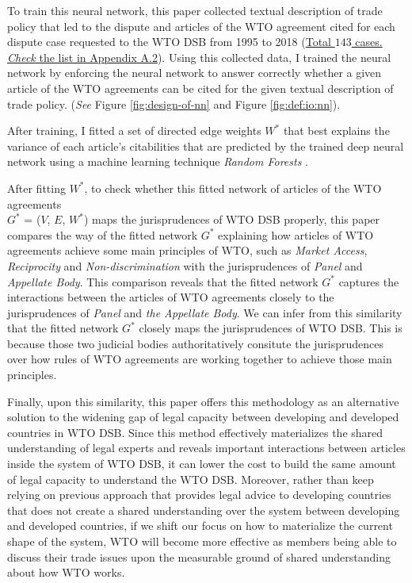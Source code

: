 
To train this neural network, this paper collected textual description of trade policy 
that led to the dispute and articles of the WTO agreement cited for each dispute
case requested to the WTO DSB 
from 1995 to 2018 (\hyperref[sub:cited-articles-table]{Total $143$ cases. \textit{Check} the list in Appendix A.2}).
Using this collected data, I trained the neural network by enforcing the neural network to answer correctly 
whether a given article of the WTO agreements
can be cited for the given textual description of 
trade policy. (\textit{See} Figure \ref{fig:design-of-nn} and Figure \ref{fig:def:io:nn}).

After training, I fitted a set of directed edge weights $W^*$ that 
best explains the variance of each article's citabilities that are predicted by the trained deep neural network using a machine learning technique \textit{Random Forests} \citep{rf, genie3}. 

After fitting $W^*$, to check whether this fitted network of articles of the WTO agreements\\  $G^*$ = ($V$, $E$, $W^*$) maps the jurisprudences of WTO DSB properly, this paper
compares the way of the fitted network $G^*$ explaining how articles of WTO agreements achieve some main principles of WTO, such as \textit{Market Access}, \textit{Reciprocity} and \textit{Non-discrimination} 
with the jurisprudences of \textit{Panel} and \textit{Appellate Body}. This comparison reveals that the fitted network $G^*$ captures the interactions between the articles of WTO agreements
closely to the jurisprudences of \textit{Panel} and \textit{the Appellate Body}. We can infer from this similarity that the fitted network $G^*$ closely maps the jurisprudences of WTO DSB. This is because those two judicial bodies 
authoritatively consitute the jurisprudences over how rules of WTO agreements are working together 
to achieve those main principles.

Finally, upon this similarity, this paper offers this methodology as
an alternative solution to the widening gap of legal capacity between developing and developed countries in WTO DSB.
Since this method effectively materializes the shared understanding of legal experts and reveals important interactions between articles inside the system of WTO DSB,
it can lower the cost to build the same amount of legal capacity to understand the WTO DSB.
Moreover, rather than keep relying on previous approach that provides legal advice to developing countries that does not create a shared understanding over the system between developing and developed countries,
if we shift our focus on how to materialize the current shape of the system, WTO
will become more effective as members being able to discuss their trade issues upon the measurable ground of shared understanding about how WTO works.

